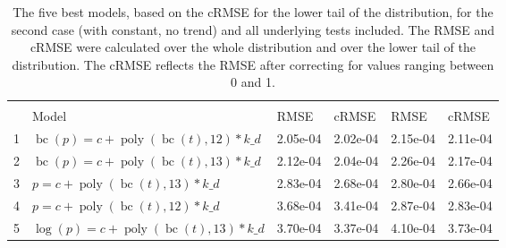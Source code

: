 \documentclass[12pt,a4paper]{article}
\DeclareMathOperator{\bc}{bc}
\DeclareMathOperator{\poly}{poly}
\begin{document}
\begin{table}[!h]

\caption{\label{tab:5_best_all_2}\label{tab:best_all_2} The five best models, based on the cRMSE for the lower tail of the distribution, for the second case (with constant, no trend) and all underlying tests included. The RMSE and cRMSE were calculated over the whole distribution and over the lower tail of the distribution. The cRMSE reflects the RMSE after correcting for values ranging between 0 and 1.}
\centering
\fontsize{10}{12}\selectfont
\begin{tabular}[t]{ll>{\raggedleft\arraybackslash}p{2cm}>{\raggedleft\arraybackslash}p{2cm}>{\raggedleft\arraybackslash}p{2cm}>{\raggedleft\arraybackslash}p{2cm}}
\toprule
\multicolumn{1}{c}{\textbf{}} & \multicolumn{1}{c}{\textbf{}} & \multicolumn{2}{c}{\textbf{Full Distribution}} & \multicolumn{2}{c}{\textbf{Lower Tail ($p \leq 0.2$)}} \\
\cmidrule(l{3pt}r{3pt}){3-4} \cmidrule(l{3pt}r{3pt}){5-6}
  & Model & RMSE & cRMSE & RMSE & cRMSE\\
\midrule
\rowcolor{gray!6}  1 & $\bc(p) = c + \poly\left( \bc(t), 12 \right) * k\_d$ & 2.05e-04 & 2.02e-04 & 2.15e-04 & 2.11e-04\\
2 & $\bc(p) = c + \poly\left( \bc(t), 13 \right) * k\_d$ & 2.12e-04 & 2.04e-04 & 2.26e-04 & 2.17e-04\\
\rowcolor{gray!6}  3 & $p = c + \poly\left( \bc(t), 13 \right) * k\_d$ & 2.83e-04 & 2.68e-04 & 2.80e-04 & 2.66e-04\\
4 & $p = c + \poly\left( \bc(t), 12 \right) * k\_d$ & 3.68e-04 & 3.41e-04 & 2.87e-04 & 2.83e-04\\
\rowcolor{gray!6}  5 & $\log(p) = c + \poly\left( \bc(t), 13 \right) * k\_d$ & 3.70e-04 & 3.37e-04 & 4.10e-04 & 3.73e-04\\
\bottomrule
\end{tabular}
\end{table}
\end{document}
